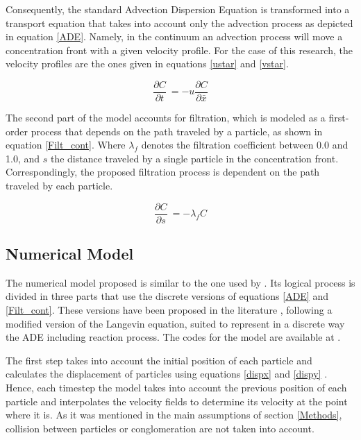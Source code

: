 \documentclass[draft,linenumbers]{agujournal2018}
\begin{document}
Consequently, the standard Advection Dispersion Equation is transformed into a transport equation that takes into account only the advection process as depicted in equation \ref{ADE}. Namely, in the continuum an advection process will move a concentration front with a given velocity profile. For the case of this research, the velocity profiles are the ones given in equations \ref{ustar} and \ref{vstar}.

\begin{equation}
 \label{ADE}
 	\frac{\partial C}{\partial t} \ = -u \frac{\partial C}{\partial \bar{x}}
 \end{equation}

The second part of the model accounts for filtration, which is modeled as a first-order process that depends on the path traveled by a particle, as shown in equation \ref{Filt_cont}. Where $\lambda_f$ denotes the filtration coefficient between 0.0 and 1.0, and $s$ the distance traveled by a single particle in the concentration front. Correspondingly, the proposed filtration process is dependent on the path traveled by each particle. 

 \begin{equation}
 \label{Filt_cont}
 	\frac{\partial C}{\partial s} \ = -\lambda_f C
 \end{equation}

\subsection{Numerical Model} \label{Numerical_model}

The numerical model proposed is similar to the one used by \citet{Packman2000}. Its logical process is divided in three parts that use the discrete versions of equations \ref{ADE} and \ref{Filt_cont}. These versions have been proposed in the literature \citep{Delay2005,Dentz2011}, following a modified version of the Langevin equation, suited to represent in a discrete way the ADE including reaction process. The codes for the model are available at \citep{Preziosi2019}.

The first step takes into account the initial position of each particle and calculates the displacement of particles using equations \ref{dispx} and \ref{dispy} \citep{Li2017}. Hence, each timestep the model takes into account the previous position of each particle and interpolates the velocity fields to determine its velocity at the point where it is. As it was mentioned in the main assumptions of section \ref{Methods}, collision between particles or conglomeration are not taken into account. 
\end{document}
